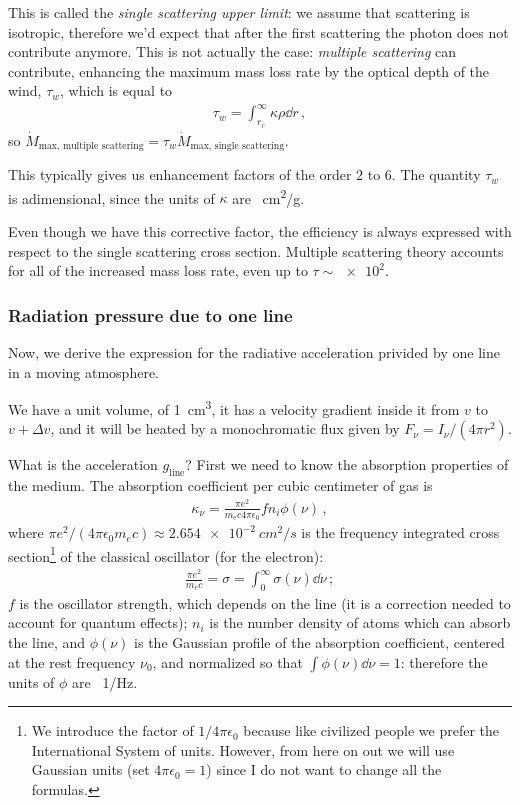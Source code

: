 \documentclass[main.tex]{subfiles}
\begin{document}
This is called the \emph{single scattering upper limit}: we assume that scattering is isotropic, therefore we'd expect that after the first scattering the photon does not contribute anymore.
This is not actually the case: \emph{multiple scattering} can contribute, enhancing the maximum mass loss rate by the optical depth of the wind, \(\tau_{w}\), which is equal to 
%
\begin{align}
\tau_{w} = \int _{r_c}^{\infty} \kappa \rho \dd{r} 
\,,
\end{align}
%
so \(\dot{M} _{\text{max, multiple scattering}} =\tau_{w} \dot{M} _{\text{max, single scattering}}\).

This typically gives us enhancement factors of the order \(2\) to \(6\).
The quantity \(\tau _w\) is adimensional, since the units of \(\kappa \) are \SI{}{cm^2/g}.

Even though we have this corrective factor, the efficiency is always expressed with respect to the single scattering cross section.
Multiple scattering theory accounts for all of the increased mass loss rate, even up to \(\tau \sim \num{e2}\).


\subsubsection{Radiation pressure due to one line}

Now, we derive the expression for the radiative acceleration privided by one line in a moving atmosphere.

We have a unit volume, of \SI{1}{cm^3}, it has a velocity gradient inside it from \(v\) to \(v + \Delta v\), and it will be heated by a monochromatic flux given by \(F_{\nu } = I_{\nu } / (4 \pi r^2)\).

What is the acceleration \(g _{\text{line}}\)?
First we need to know the absorption properties of the medium. 
The absorption coefficient per cubic centimeter of gas is 
%
\begin{align}
  \kappa_{\nu } = \frac{\pi e^2}{m_e c 4 \pi \epsilon_0} f n_i \phi (\nu )
\,,
\end{align}
%
where \(\pi e^2/ (4 \pi \epsilon_0 m_e c) \approx \SI{2.654e-2}{cm^2/s}\) is the frequency integrated cross section\footnote{We introduce the factor of \(1/4 \pi \epsilon_0 \) because like civilized people we prefer the International System of units. However, from here on out we will use Gaussian units (set \(4 \pi \epsilon_0 =1\)) since I do not want to change all the formulas.} of the classical oscillator (for the electron):
%
\begin{align}
  \frac{\pi e^2}{m_e c} = \sigma = \int_0^{\infty} \sigma (\nu ) \dd{\nu }
\,;
\end{align}
%
\(f\) is the oscillator strength, which depends on the line (it is a correction needed to account for quantum effects);
\(n_i\) is the number density of atoms which can absorb the line, and \(\phi (\nu )\) is the Gaussian profile of the absorption coefficient, centered at the rest frequency \(\nu_0 \), and normalized so that \(\int \phi (\nu ) \dd{\nu } = 1\): therefore the units of \(\phi\) are \SI{}{1/Hz}.
\end{document}
